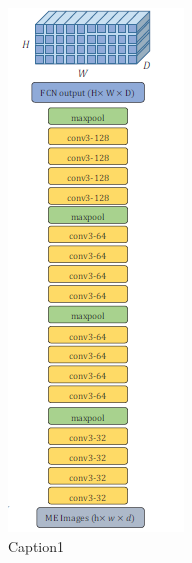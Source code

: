 \documentclass{beamer}
\begin{document}
\begin{frame}
	
	\begin{figure}
		\includegraphics[width=0.7\linewidth]{FCN.png} 
		\caption{Caption1}
		\label{fig:subim1}
	\end{figure}
	

\end{frame}
\end{document}
